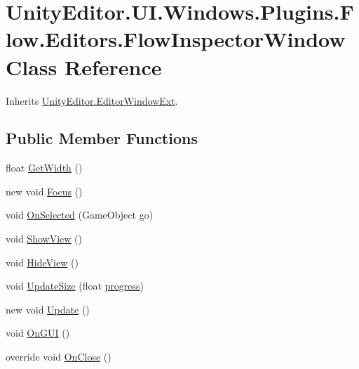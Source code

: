 \hypertarget{class_unity_editor_1_1_u_i_1_1_windows_1_1_plugins_1_1_flow_1_1_editors_1_1_flow_inspector_window}{}\section{Unity\+Editor.\+U\+I.\+Windows.\+Plugins.\+Flow.\+Editors.\+Flow\+Inspector\+Window Class Reference}
\label{class_unity_editor_1_1_u_i_1_1_windows_1_1_plugins_1_1_flow_1_1_editors_1_1_flow_inspector_window}


Inherits \hyperlink{class_unity_editor_1_1_editor_window_ext}{Unity\+Editor.\+Editor\+Window\+Ext}.

\subsection*{Public Member Functions}
\begin{DoxyCompactItemize}
\item 
float \hyperlink{class_unity_editor_1_1_u_i_1_1_windows_1_1_plugins_1_1_flow_1_1_editors_1_1_flow_inspector_window_a8dabc2c8fd5f6ffa1fa598fdd81ceea0}{Get\+Width} ()
\item 
new void \hyperlink{class_unity_editor_1_1_u_i_1_1_windows_1_1_plugins_1_1_flow_1_1_editors_1_1_flow_inspector_window_ac6ca5e70b624e06d7de9f7047c43ccbd}{Focus} ()
\item 
void \hyperlink{class_unity_editor_1_1_u_i_1_1_windows_1_1_plugins_1_1_flow_1_1_editors_1_1_flow_inspector_window_ac2706869af63ae63b4765ae9d288b949}{On\+Selected} (Game\+Object go)
\item 
void \hyperlink{class_unity_editor_1_1_u_i_1_1_windows_1_1_plugins_1_1_flow_1_1_editors_1_1_flow_inspector_window_addbd0845e0cec90d2ec0985cfe151552}{Show\+View} ()
\item 
void \hyperlink{class_unity_editor_1_1_u_i_1_1_windows_1_1_plugins_1_1_flow_1_1_editors_1_1_flow_inspector_window_a93d1a7a5106978beab677e6485cf4e40}{Hide\+View} ()
\item 
void \hyperlink{class_unity_editor_1_1_u_i_1_1_windows_1_1_plugins_1_1_flow_1_1_editors_1_1_flow_inspector_window_ae15a7ffefd742b514f247c2d59b8d213}{Update\+Size} (float \hyperlink{class_unity_editor_1_1_editor_window_ext_ad4fc5cfe734a2117bf611005da84573e}{progress})
\item 
new void \hyperlink{class_unity_editor_1_1_u_i_1_1_windows_1_1_plugins_1_1_flow_1_1_editors_1_1_flow_inspector_window_a5124665fb1f0f37e929220a5e4047175}{Update} ()
\item 
void \hyperlink{class_unity_editor_1_1_u_i_1_1_windows_1_1_plugins_1_1_flow_1_1_editors_1_1_flow_inspector_window_a7a6411667d174cbfa9020187818c0687}{On\+G\+U\+I} ()
\item 
override void \hyperlink{class_unity_editor_1_1_u_i_1_1_windows_1_1_plugins_1_1_flow_1_1_editors_1_1_flow_inspector_window_ab83a6a76793cdb7bf5c6e7f6901c5a3b}{On\+Close} ()
\end{DoxyCompactItemize}
